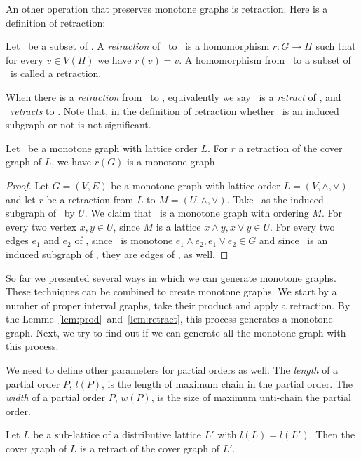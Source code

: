 An other operation that preserves monotone graphs is retraction. Here is a definition
of retraction:

\begin{defi} [Retraction]
Let \mH\ be a subset of \mG\@. A \emph{retraction} of \mG\ to \mH\ is a 
homomorphism \(r: G\to H\) such that for every \(v\in V(H)\) we have
\(r(v) = v\)\@.
A homomorphism from \mG\ to a subset of \mG\ is called a retraction.
\end{defi}
When there is a \emph{retraction} from \mH\ to \mG, equivalently we say
\mH\ is a \emph{retract} of \mG, and \mG\ \emph{retracts} to \mH\@.
Note that, in the definition of retraction whether \mH\ is an induced subgraph or not 
is not significant.

\begin{lemma} \label{lem:retract}
Let \mG\ be a monotone graph with lattice order \(L\)\@.
For \(r\) a retraction of the cover graph of \(L\), we have \(r(G)\) is a monotone graph
\end{lemma}

\begin{proof}
Let \(G=(V,E)\) be a monotone graph with lattice order \(L=(V, \wedge,\vee)\) and
let \(r\) be a retraction from \(L\) to \(M =(U, \wedge, \vee)\)\@.
Take \mH\ as the induced subgraph of \mG\ by \(U\)\@.
We claim that \mH\ is a monotone graph with ordering \(M\)\@.
For every two vertex \(x,y\in U\), since \(M\) is a lattice
\(x\wedge y,x\vee y\in U\)\@. For every two edges \(e_1\) and \(e_2\) of
\mH, since \mG\ is monotone \(e_1\wedge e_2,e_1\vee e_2\in G\)
and since \mH\ is an induced subgraph of \mG, they are edges of 
\mH, as well.
\end{proof}

So far we presented several ways in which we can generate monotone graphs.
These techniques can be combined to create monotone graphs.
We start by a number of proper interval graphs, take their product and apply a retraction.
By the Lemme~\ref{lem:prod}~and~\ref{lem:retract}, this process generates a monotone graph.
Next, we try to find out if we can generate all the monotone graph with this process.

We need to define other parameters for partial orders as well.
The \emph{length} of a partial order \(P\), \(l(P)\), is the length of maximum chain in
the partial order. The \emph{width} of a partial order \(P\),
\(w(P)\), is the size of maximum unti-chain the partial order.

\begin{theorem}  \label{thm:DR}
Let \(L\) be a sub-lattice of a distributive lattice \(L'\) with
\(l(L)=l(L')\)\@. Then the cover graph of \(L\) is a retract of the cover graph of 
\(L'\)\@.
\end{theorem}

